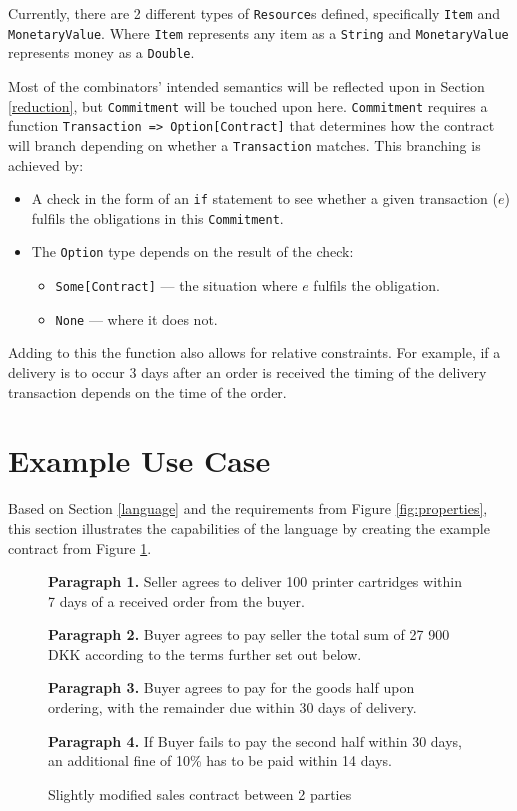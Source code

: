 \documentclass{ituthesis}
\begin{document}
Currently, there are 2 different types of \texttt{Resource}s defined, specifically \texttt{Item} and \texttt{MonetaryValue}. Where \texttt{Item} represents any item as a \texttt{String} and \texttt{MonetaryValue} represents money as a \texttt{Double}.

Most of the combinators' intended semantics will be reflected upon in Section \ref{reduction}, but \texttt{Commitment} will be touched upon here. \texttt{Commitment} requires a function \texttt{Transaction => Option[Contract]} that determines how the contract will branch depending on whether a \texttt{Transaction} matches. This branching is achieved by:
\begin{itemize}
    \item A check in the form of an \texttt{if} statement to see whether a given transaction ($e$) fulfils the obligations in this \texttt{Commitment}.
    \item The \texttt{Option} type depends on the result of the check:
    \begin{itemize}
        \item \texttt{Some[Contract]} --- the situation where $e$ fulfils the obligation.
        \item \texttt{None} --- where it does not.
    \end{itemize}
\end{itemize}
Adding to this the function also allows for relative constraints. For example, if a delivery is to occur 3 days after an order is received the timing of the delivery transaction depends on the time of the order.

\section{Example Use Case} \label{exampleUseCase}
Based on Section \ref{language} and the requirements from Figure \ref{fig:properties}, this section illustrates the capabilities of the language by creating the example contract from Figure \ref{fig:contract}.

\begin{figure}[!h]
    \centering
    \begin{tcolorbox}
        \textbf{Paragraph 1.} Seller agrees to deliver 100 printer cartridges within 7 days of a received order from the buyer.\par
        \textbf{Paragraph 2.} Buyer agrees to pay seller the total sum of 27 900 DKK according to the terms further set out below.\par
        \textbf{Paragraph 3.} Buyer agrees to pay for the goods half upon ordering, with the remainder due within
        30 days of delivery.\par
        \textbf{Paragraph 4.} If Buyer fails to pay the second half within 30 days, an additional fine of 10\% has
        to be paid within 14 days.\par
    \end{tcolorbox}
    \caption{Slightly modified sales contract between 2 parties \cite{hvitved2011contract}}
    \label{fig:contract}
\end{figure}
\end{document}
